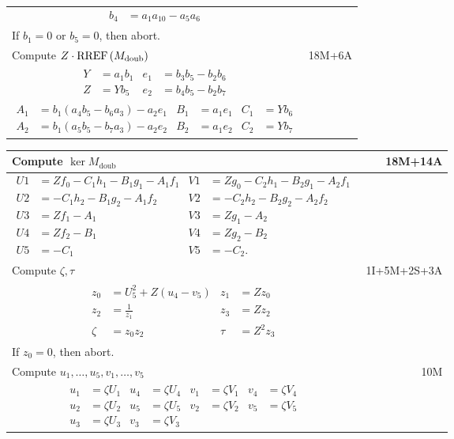 \begin{tabularx}{\linewidth}{|Xr|}
{\begin{align*}
    b_4 &= a_1a_{10} - a_5a_6
  \end{align*}} & \\
  If $b_1 =0$ or $b_5 = 0$, then abort. & \\
  \hline
  Compute $Z \cdot \operatorname{RREF}\left(M_{\text{doub}}\right)$ & 18M+6A \\
  \hline
  {\begin{align*}
    Y &= a_1b_1 & e_1 &= b_3b_5 - b_2b_6 \\
    Z &= Yb_5   & e_2 &= b_4b_5 - b_2b_7
  \end{align*}} & \\
  {\begin{align*}
    A_1 &= b_1(a_4b_5 - b_6a_3) - a_2e_1 & B_1 &= a_1e_1 & C_1 &= Yb_6 \\
    A_2 &= b_1(a_5b_5 - b_7a_3) - a_2e_2 & B_2 &= a_1e_2 & C_2 &= Yb_7
  \end{align*}} & \\
  \hline
\end{tabularx}

\pagebreak
\begin{tabularx}{\linewidth}{|Xr|}
  \hline
    Compute $\ker M_{\text{doub}}$ & 18M+14A \\
  \hline
  {\begin{align*}
    U1 &= Zf_0 - C_1h_1 - B_1g_1 - A_1f_1 & V1 &= Zg_0 - C_2h_1 - B_2g_1 - A_2f_1 \\
    U2 &=      - C_1h_2 - B_1g_2 - A_1f_2 & V2 &=      - C_2h_2 - B_2g_2 - A_2f_2 \\
    U3 &= Zf_1 - A_1 & V3 &= Zg_1 - A_2 \\
    U4 &= Zf_2 - B_1 & V4 &= Zg_2 - B_2 \\
    U5 &=      - C_1 & V5 &=      - C_2.
  \end{align*}} & \\
  \hline
    Compute $\zeta, \tau$ & 1I+5M+2S+3A \\
  \hline
  {\begin{align*}
    z_0 &= U_5^2 + Z(u_4 - v_5) & z_1 &= Zz_0 \\
    z_2 &= \frac 1 {z_1} & z_3 &= Zz_2 \\
    \zeta &= z_0z_2 & \tau  &= Z^2z_3
  \end{align*}} & \\
  If $z_0 = 0$, then abort. & \\
  \hline
    Compute $u_1, \ldots, u_5, v_1, \ldots, v_5$ & 10M \\
  \hline
  {\begin{align*}
    u_1 &= \zeta U_1 & u_4 &= \zeta U_4 & v_1 &= \zeta V_1 & v_4 &= \zeta V_4 \\
    u_2 &= \zeta U_2 & u_5 &= \zeta U_5 & v_2 &= \zeta V_2 & v_5 &= \zeta V_5 \\
    u_3 &= \zeta U_3                    & v_3 &= \zeta V_3
  \end{align*}} & \\
  \hline
\end{tabularx}

